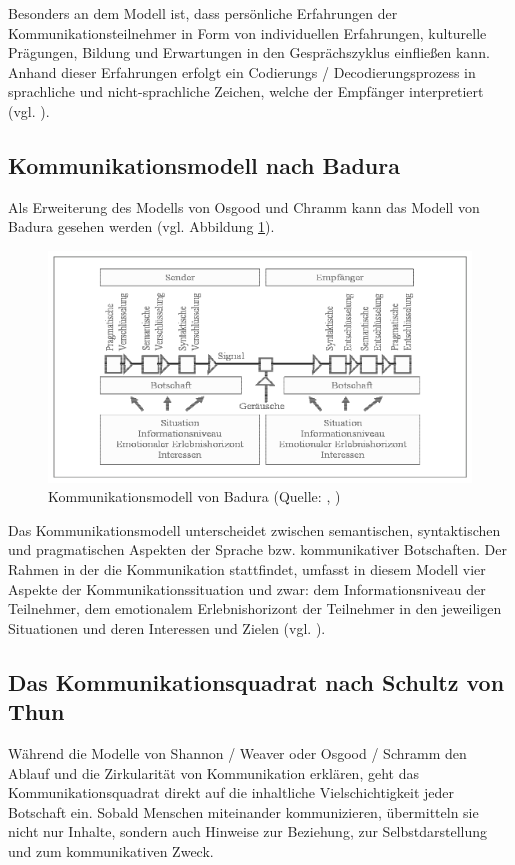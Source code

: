 Besonders an dem Modell ist, dass persönliche Erfahrungen der Kommunikationsteilnehmer in Form von individuellen Erfahrungen, kulturelle Prägungen, Bildung und Erwartungen in den Gesprächszyklus einfließen kann. Anhand dieser Erfahrungen erfolgt ein Codierungs / Decodierungsprozess in sprachliche und nicht-sprachliche Zeichen, welche der Empfänger interpretiert (vgl. \cite{noauthor_osgood_2024}). 

\subsection{Kommunikationsmodell nach Badura}
Als Erweiterung des Modells von Osgood und Chramm kann das Modell von Badura gesehen werden (vgl. Abbildung \ref{fig:badura-modell}).

\begin{figure}[ht]
\centering
\includegraphics[width=1\linewidth]{content/pictures/badura.PNG}
\caption{Kommunikationsmodell von Badura (Quelle: \cite{badura_kommunikation_1992}, \cite[S. 93]{scheufele_kommunikation_2007})}
\label{fig:badura-modell}
\end{figure}

Das Kommunikationsmodell unterscheidet zwischen semantischen, syntaktischen und pragmatischen Aspekten der Sprache bzw. kommunikativer Botschaften. Der Rahmen in der die Kommunikation stattfindet, umfasst in diesem Modell vier Aspekte der Kommunikationssituation und zwar: dem Informationsniveau der Teilnehmer, dem emotionalem Erlebnishorizont der Teilnehmer in den jeweiligen Situationen und deren Interessen und Zielen (vgl. \cite[S. 93]{scheufele_kommunikation_2007}).

\subsection{Das Kommunikationsquadrat nach Schultz von Thun}
Während die Modelle von Shannon / Weaver oder Osgood / Schramm den Ablauf und die Zirkularität von Kommunikation erklären, geht das Kommunikationsquadrat direkt auf die inhaltliche Vielschichtigkeit jeder Botschaft ein. Sobald Menschen miteinander kommunizieren, übermitteln sie nicht nur Inhalte, sondern auch Hinweise zur Beziehung, zur Selbstdarstellung und zum kommunikativen Zweck.

